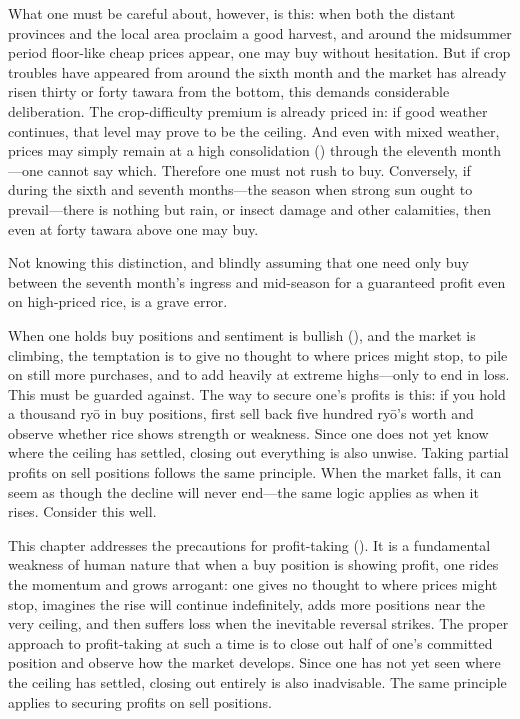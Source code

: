 What one must be careful about, however, is this: when both the distant
provinces and the local area proclaim a good harvest, and around the
midsummer period floor-like cheap prices appear, one may buy without
hesitation. But if crop troubles have appeared from around the sixth month
and the market has already risen thirty or forty tawara from the bottom,
this demands considerable deliberation. The crop-difficulty premium is
already priced in: if good weather continues, that level may prove to be
the ceiling. And even with mixed weather, prices may simply remain at a
high consolidation () through the eleventh
month---one cannot say which. Therefore one must not rush to buy.
Conversely, if during the sixth and seventh months---the season when
strong sun ought to prevail---there is nothing but rain, or insect damage
and other calamities, then even at forty tawara above one may buy.

Not knowing this distinction, and blindly assuming that one need only buy
between the seventh month's ingress and mid-season for a guaranteed profit
even on high-priced rice, is a grave error.


\begin{sokyubox}
{\small\itshape\color{sokyubar} }

\medskip
When one holds buy positions and sentiment is bullish (),
and the market is climbing, the temptation is to give no thought to where
prices might stop, to pile on still more purchases, and to add heavily at
extreme highs---only to end in loss. This must be guarded against. The way
to secure one's profits is this: if you hold a thousand ry\=o in buy
positions, first sell back five hundred ry\=o's worth and observe whether
rice shows strength or weakness. Since one does not yet know where the
ceiling has settled, closing out everything is also unwise. Taking partial
profits on sell positions follows the same principle. When the market
falls, it can seem as though the decline will never end---the same logic
applies as when it rises. Consider this well.
\end{sokyubox}

\commentary
This chapter addresses the precautions for profit-taking ().
It is a fundamental weakness of human nature that when a buy position is
showing profit, one rides the momentum and grows arrogant: one gives no
thought to where prices might stop, imagines the rise will continue
indefinitely, adds more positions near the very ceiling, and then suffers
loss when the inevitable reversal strikes. The proper approach to
profit-taking at such a time is to close out half of one's committed
position and observe how the market develops. Since one has not yet seen
where the ceiling has settled, closing out entirely is also inadvisable.
The same principle applies to securing profits on sell positions.

